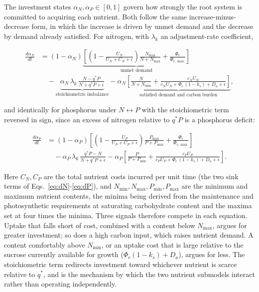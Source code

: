 \documentclass[a4paper,fleqn]{cas-sc}
\begin{document}
The investment states $\alpha_N,\alpha_P \in [0,1]$ govern how strongly the
root system is committed to acquiring each nutrient. Both follow the same
increase-minus-decrease form, in which the increase is driven by unmet
demand and the decrease by demand already satisfied. For nitrogen, with
$\lambda_k$ an adjustment-rate coefficient,

\begin{align}
\frac{d\alpha_N}{dt} &=
(1-\alpha_N)
\underbrace{\left[
\left(1 - \frac{U_N}{U_N + C_N + \epsilon}\right)
\frac{N_{\max}}{N + N_{\max}}
+ \frac{\Phi_c}{\Phi_{c,\max}}
\right]}_{\text{unmet demand}}
\\
&\quad
- \underbrace{\alpha_N\,\lambda_k\,
\frac{N - q^{*}P}{N + q^{*}P + \epsilon}}_{\text{stoichiometric imbalance}}
- \alpha_N
\underbrace{\left[
\frac{N}{N + N_{\min}}
+ \frac{c_N U_N}
       {c_N U_N + \Phi_c\,(1-k_s) + D_a + \epsilon}
\right]}_{\text{satisfied demand and carbon burden}},
\label{eq:dalphaN}
\end{align}

and identically for phosphorus under $N \leftrightarrow P$ with the
stoichiometric term reversed in sign, since an excess of nitrogen relative
to $q^{*}P$ is a phosphorus deficit:

\begin{align}
\frac{d\alpha_P}{dt} &=
(1-\alpha_P)
\left[
\left(1 - \frac{U_P}{U_P + C_P + \epsilon}\right)
\frac{P_{\max}}{P + P_{\max}}
+ \frac{\Phi_c}{\Phi_{c,\max}}
\right]
\\
&\quad
- \alpha_P\,\lambda_k\,
\frac{q^{*}P - N}{N + q^{*}P + \epsilon}
- \alpha_P
\left[
\frac{P}{P + P_{\min}}
+ \frac{c_P U_P}
       {c_P U_P + \Phi_c\,(1-k_s) + D_a + \epsilon}
\right].
\label{eq:dalphaP}
\end{align}

Here $C_N,C_P$ are the total nutrient costs incurred per unit time (the
two sink terms of Eqs.~\eqref{eq:dN}-\eqref{eq:dP}), and
$N_{\min},N_{\max},P_{\min},P_{\max}$ are the minimum and maximum nutrient
contents, the minima being derived from the maintenance and photosynthetic
requirements at saturating carbohydrate content and the maxima set at four
times the minima. Three signals therefore compete in each equation. Uptake
that falls short of cost, combined with a content below $N_{\max}$, argues
for greater investment; so does a high carbon input, which raises nutrient
demand. A content comfortably above $N_{\min}$, or an uptake cost that is
large relative to the sucrose currently available for growth
($\Phi_c(1-k_s) + D_a$), argues for less. The stoichiometric term redirects
investment toward whichever nutrient is scarce relative to $q^{*}$, and is
the mechanism by which the two nutrient submodels interact rather than
operating independently.
\end{document}
